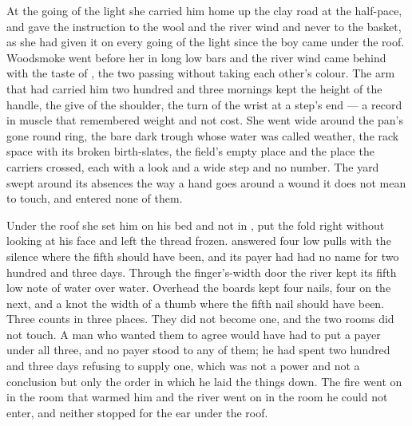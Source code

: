 \scenebreak

At the going of the light she carried him home up the clay road at the half-pace, and gave the instruction to the wool and the river wind and never to the basket, as she had given it on every going of the light since the boy came under the roof. Woodsmoke went before her in long low bars and the river wind came behind with the taste of , the two passing without taking each other's colour. The arm that had carried him two hundred and three mornings kept the height of the handle, the give of the shoulder, the turn of the wrist at a step's end --- a record in muscle that remembered weight and not cost. She went wide around the pan's gone round ring, the bare dark trough whose water was called weather, the rack space with its broken birth-slates, the field's empty place and the place the carriers crossed, each with a look and a wide step and no number. The yard swept around its absences the way a hand goes around a wound it does not mean to touch, and entered none of them.

Under the roof she set him on his bed and not in , put the fold right without looking at his face and left the thread frozen.  answered four low pulls with the silence where the fifth should have been, and its payer had had no name for two hundred and three days. Through the finger's-width door the river kept its fifth low note of water over water. Overhead the boards kept four nails, four on the next, and a knot the width of a thumb where the fifth nail should have been. Three counts in three places. They did not become one, and the two rooms did not touch. A man who wanted them to agree would have had to put a payer under all three, and no payer stood to any of them; he had spent two hundred and three days refusing to supply one, which was not a power and not a conclusion but only the order in which he laid the things down. The fire went on in the room that warmed him and the river went on in the room he could not enter, and neither stopped for the ear under the roof.

\scenebreak

